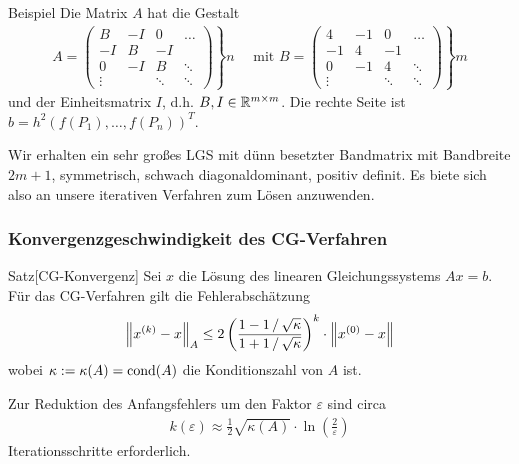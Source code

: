 \begin{colboxBreakable}{Beispiel}
  Die Matrix $A$ hat die Gestalt
  \begin{align*}A = \left.
    \begin{pmatrix}
      B & -I & 0 & \dots\\
      -I & B & -I & \\
      0 & -I & B & \ddots \\
      \vdots& & \ddots & \ddots
    \end{pmatrix}\right\} n \quad \text{ mit } B = \left.\begin{pmatrix}
      4 & -1 & 0 & \dots\\
      -1 & 4 & -1 & \\
      0 & -1 & 4 & \ddots \\
      \vdots& & \ddots & \ddots
    \end{pmatrix}\right\}m
  \end{align*}
  und der Einheitsmatrix $I$, d.h. $B,I\in\mathbb R^{m\times m}$. 
  Die rechte Seite ist $b=h^2(f(P_1),\dots,f(P_n))^T$. 
  
  Wir erhalten ein sehr großes LGS mit dünn besetzter Bandmatrix mit Bandbreite $2m+1$, symmetrisch, 
  schwach diagonaldominant, positiv definit. Es biete sich also an unsere iterativen Verfahren zum Lösen 
  anzuwenden.
\end{colboxBreakable}

\subsubsection{Konvergenzgeschwindigkeit des CG-Verfahren}

\begin{colbox}{Satz}[CG-Konvergenz]\label{satz:CGVconv}
  Sei $x$ die Lösung des linearen Gleichungssystems $Ax=b$. Für das CG-Verfahren gilt die Fehlerabschätzung
  \begin{align*}
    \vertn{2}{x^{(k)} - x}_A 
    \leq 2\left(\dfrac{1-1\,/\,\sqrt{\kappa}}{1+1\,/\,\sqrt{\kappa}}\right)^k \cdot \vertn{2}{x^{(0)}-x}
  \end{align*}
  wobei $\kappa := \kappa(A) = \operatorname*{cond}(A)$ die Konditionszahl von $A$ ist.
  
  Zur Reduktion des Anfangsfehlers um den Faktor $\varepsilon$ sind circa 
  \begin{align*}
    k(\varepsilon)\approx \tfrac{1}{2}\sqrt{\kappa(A)}\cdot \ln(\tfrac{2}{\varepsilon})
  \end{align*}
  Iterationsschritte erforderlich. 
\end{colbox}

